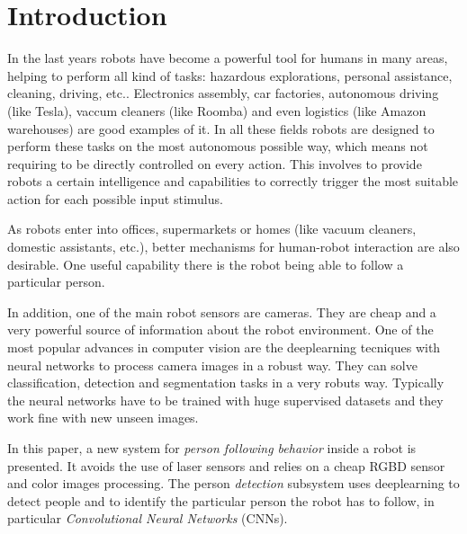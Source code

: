 \section{Introduction}

In the last years robots have become a powerful tool for humans in many areas, helping to perform all kind of tasks: hazardous explorations, personal assistance, cleaning, driving, etc.. Electronics assembly, car factories, autonomous driving (like Tesla), vaccum cleaners (like Roomba) and even logistics (like Amazon warehouses) are good examples of it. In all these fields robots are designed to perform these tasks on the most autonomous possible way, which means not requiring to be directly controlled on every action. This involves to provide robots a certain intelligence and capabilities to correctly trigger the most suitable action for each possible input stimulus. 

As robots enter into offices, supermarkets or homes (like vacuum cleaners, domestic assistants, etc.), better mechanisms for human-robot interaction are also desirable. One useful capability there is the robot being able to follow a particular person. 

In addition, one of the main robot sensors are cameras. They are cheap and a very powerful source of information about the robot environment. One of the most popular advances in computer vision are the deeplearning tecniques with neural networks to process camera images in a robust way. They can solve classification, detection and segmentation tasks in a very robuts way. Typically the neural networks have to be trained with huge supervised datasets and they work fine with new unseen images. 


In this paper, a new system for \emph{person following behavior} inside a robot is presented. It avoids the use of laser sensors and relies on a cheap RGBD sensor and color images processing. The person \emph{detection} subsystem uses deeplearning to detect people and to identify the particular person the robot has to follow, in particular \emph{Convolutional Neural Networks} (CNNs).



